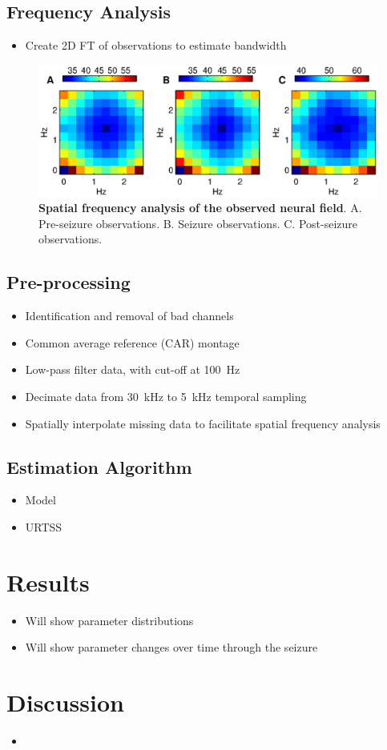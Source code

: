 \documentclass[]{article}
\begin{document}
\subsection{Frequency Analysis}
\begin{itemize}
	\item Create 2D FT of observations to estimate bandwidth
\end{itemize}

\begin{figure}[!ht]
\begin{center}
\includegraphics{./Figures/SpatialFreq.eps}
\end{center}
\caption{{\bf Spatial frequency analysis of the observed neural field}. A. Pre-seizure observations. B. Seizure observations. C. Post-seizure observations.}
\label{fig:SpatialFreqObservation}
\end{figure}

\subsection{Pre-processing}
\begin{itemize}
	\item Identification and removal of bad channels
	\item Common average reference (CAR) montage 
	\item Low-pass filter data, with cut-off at 100~Hz
	\item Decimate data from 30~kHz to 5~kHz temporal sampling
	\item Spatially interpolate missing data to facilitate spatial frequency analysis
\end{itemize}
\subsection{Estimation Algorithm}
\begin{itemize}
	\item Model
	\item URTSS
\end{itemize}

\section{Results}
\begin{itemize}
	\item Will show parameter distributions
	\item Will show parameter changes over time through the seizure
\end{itemize}

\section{Discussion}
\begin{itemize}
	\item  
\end{itemize}



\end{document}
